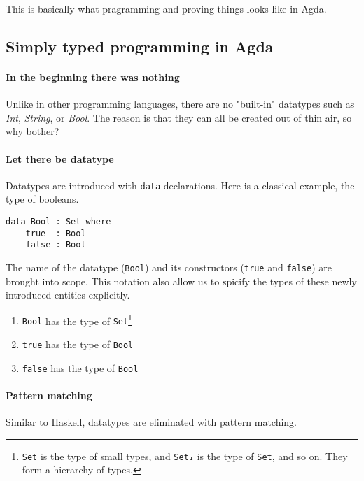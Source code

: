 \documentclass[12pt, a4paper]{article}
\begin{document}
This is basically what pragramming and proving things looks like in Agda.

\subsection{Simply typed programming in Agda}

\paragraph{In the beginning there was nothing}
Unlike in other programming languages, there are no "built-in"
datatypes such as \textit{Int}, \textit{String}, or \textit{Bool}.
The reason is that they can all be created out of thin air, so why bother?

\paragraph{Let there be datatype}
Datatypes are introduced with {\lstinline|data|} declarations. Here is a classical example, the type of booleans.

\begin{lstlisting}
data Bool : Set where
    true  : Bool
    false : Bool
\end{lstlisting}

The name of the datatype ({\lstinline|Bool|}) and its constructors ({\lstinline|true|} and {\lstinline|false|}) are brought into scope.
This notation also allow us to spicify the types of these newly introduced entities explicitly.

\begin{enumerate}
    \item {\lstinline|Bool|} has the type of {\lstinline|Set|}\footnote{{\lstinline|Set|} is the type of small types, and {\lstinline|Set₁|} is the type
of {\lstinline|Set|}, and so on. They form a hierarchy of types.}
    \item {\lstinline|true|} has the type of {\lstinline|Bool|}
    \item {\lstinline|false|} has the type of {\lstinline|Bool|}
\end{enumerate}

\paragraph{Pattern matching}
Similar to Haskell, datatypes are eliminated with pattern matching.
\end{document}
